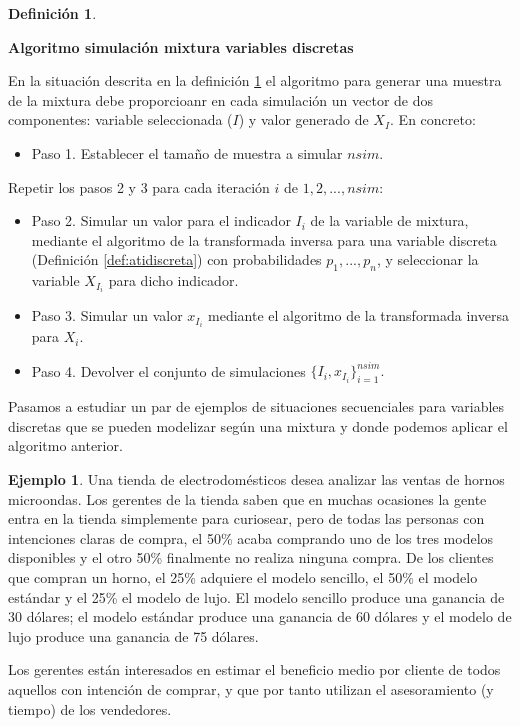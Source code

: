 \documentclass[
]{book}
\providecommand{\tightlist}{%
  \setlength{\itemsep}{0pt}\setlength{\parskip}{0pt}}
\newenvironment{silverbox}{
  \definecolor{shadecolor}{rgb}{192, 192, 192}  
  \color{black}
  \begin{shaded}}
 {\end{shaded}}
\theoremstyle{definition}
\newtheorem{definition}{Definición}[chapter]
\theoremstyle{definition}
\newtheorem{example}{Ejemplo}[chapter]
\theoremstyle{definition}
\theoremstyle{definition}
\theoremstyle{remark}
\begin{document}
\begin{silverbox}

\begin{definition}
\protect\hypertarget{def:mixturadiscreta}{}\label{def:mixturadiscreta}

\textbf{Algoritmo simulación mixtura variables discretas}

En la situación descrita en la definición \ref{def:mixturadiscreta} el algoritmo para generar una muestra de la mixtura debe proporcioanr en cada simulación un vector de dos componentes: variable seleccionada (\(I\)) y valor generado de \(X_I\). En concreto:

\begin{itemize}
\tightlist
\item
  Paso 1. Establecer el tamaño de muestra a simular \(nsim\).
\end{itemize}

Repetir los pasos 2 y 3 para cada iteración \(i\) de \(1, 2,..., nsim\):

\begin{itemize}
\item
  Paso 2. Simular un valor para el indicador \(I_i\) de la variable de mixtura, mediante el algoritmo de la transformada inversa para una variable discreta (Definición \ref{def:atidiscreta}) con probabilidades \(p_1,...,p_n\), y seleccionar la variable \(X_{I_i}\) para dicho indicador.
\item
  Paso 3. Simular un valor \(x_{I_i}\) mediante el algoritmo de la transformada inversa para \(X_i\).
\item
  Paso 4. Devolver el conjunto de simulaciones \(\{I_i, x_{I_i}\}_{i=1}^{nsim}.\)
\end{itemize}

\end{definition}

\end{silverbox}

Pasamos a estudiar un par de ejemplos de situaciones secuenciales para variables discretas que se pueden modelizar según una mixtura y donde podemos aplicar el algoritmo anterior.

\begin{example}
\protect\hypertarget{exm:mixtura1}{}\label{exm:mixtura1}Una tienda de electrodomésticos desea analizar las ventas de hornos microondas. Los gerentes de la tienda saben que en muchas ocasiones la gente entra en la tienda simplemente para curiosear, pero de todas las personas con intenciones claras de compra, el 50\% acaba comprando uno de los tres modelos disponibles y el otro 50\% finalmente no realiza ninguna compra. De los clientes que compran un horno, el 25\% adquiere el modelo sencillo, el 50\% el modelo estándar y el 25\% el modelo de lujo. El modelo sencillo produce una ganancia de 30 dólares; el modelo estándar produce una ganancia de 60 dólares y el modelo de lujo produce una ganancia de 75 dólares.

Los gerentes están interesados en estimar el beneficio medio por cliente de todos aquellos con intención de comprar, y que por tanto utilizan el asesoramiento (y tiempo) de los vendedores.
\end{example}
\end{document}
